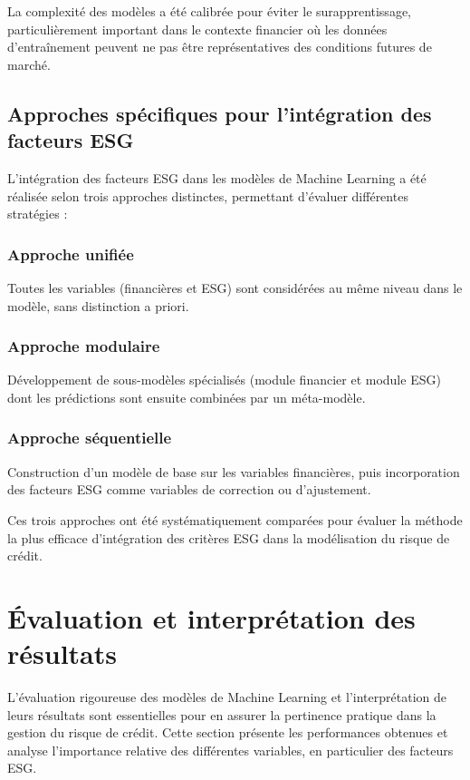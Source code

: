 La complexité des modèles a été calibrée pour éviter le surapprentissage, particulièrement important dans le contexte financier où les données d'entraînement peuvent ne pas être représentatives des conditions futures de marché.

\subsection{Approches spécifiques pour l'intégration des facteurs ESG}

L'intégration des facteurs ESG dans les modèles de Machine Learning a été réalisée selon trois approches distinctes, permettant d'évaluer différentes stratégies :

\subsubsection{Approche unifiée} 
Toutes les variables (financières et ESG) sont considérées au même niveau dans le modèle, sans distinction a priori.

\subsubsection{Approche modulaire} 
Développement de sous-modèles spécialisés (module financier et module ESG) dont les prédictions sont ensuite combinées par un méta-modèle.

\subsubsection{Approche séquentielle} 
Construction d'un modèle de base sur les variables financières, puis incorporation des facteurs ESG comme variables de correction ou d'ajustement.

Ces trois approches ont été systématiquement comparées pour évaluer la méthode la plus efficace d'intégration des critères ESG dans la modélisation du risque de crédit.

\section{Évaluation et interprétation des résultats}

L'évaluation rigoureuse des modèles de Machine Learning et l'interprétation de leurs résultats sont essentielles pour en assurer la pertinence pratique dans la gestion du risque de crédit. Cette section présente les performances obtenues et analyse l'importance relative des différentes variables, en particulier des facteurs ESG.


